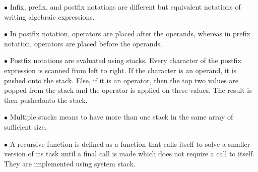 \vskip 1mm
$\bullet$ Infix, prefix, and postfix notations are different but equivalent notations of writing algebraic expressions.

\vskip 1mm
$\bullet$ In postfix notation, operators are placed after the operands, whereas in prefix notation, operators are placed before the operands.

\vskip 1mm
$\bullet$ Postfix notations are evaluated using stacks. Every character of the postfix expression is scanned from left to right. If the character is an operand, it is pushed onto the stack. Else, if it is an operator, then the top two values are popped from the stack and the operator is applied on these values. The result is then pushedonto the stack.

\vskip 1mm
$\bullet$ Multiple stacks means to have more than one stack in the same array of sufficient size.

\vskip 1mm
$\bullet$ A recursive function is defined as a function that calls itself to solve a smaller version of its task until a final call is made which does not require a call to itself. They are implemented using system stack.


\vfill\eject
\bye
